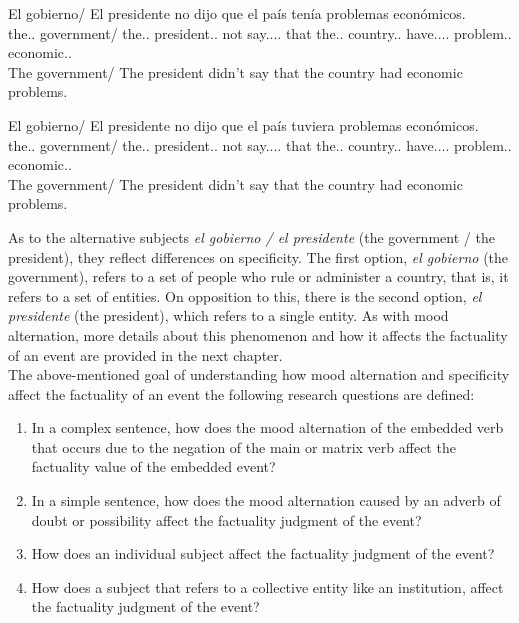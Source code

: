 \begin{exe}
  \ex
    \begin{xlist}
      \item{\gll El gobierno/ El presidente no dijo que el país tenía problemas económicos.\\ the.\M.\Sg{} government/ the.\M.\Sg{} president.\M.\Sg{} not say.\Pst.\Pfv.\Ind.\Tsg{} that the.\M.\Sg{} country.\F.\Sg{} have.\Pst.\Ipfv.\Ind.\Tsg{} problem.\M.\Pl{} economic.\M.\Pl{} \\\glt The government/ The president didn't say that the country had economic problems.}\label{ex:cond1}
      \item{\gll El gobierno/ El presidente no dijo que el país tuviera problemas económicos.\\ the.\M.\Sg{} government/ the.\M.\Sg{} president.\M.\Sg{} not say.\Pst.\Pfv.\Ind.\Tsg{} that the.\M.\Sg{} country.\F.\Sg{} have.\Pst.\Ipfv.\Sbjv.\Tsg{} problem.\M.\Pl{} economic.\M.\Pl{} \\\glt The government/ The president didn't say that the country had economic problems.}\label{ex:cond2}
    \end{xlist}
\end{exe}

As to the alternative subjects \textit{el gobierno / el presidente} (the government / the president), they reflect differences on specificity. The first option, \textit{el gobierno} (the government), refers to a set of people who rule or administer a country, that is, it refers to a set of entities. On opposition to this, there is the second option, \textit{el presidente} (the president), which refers to a single entity. As with mood alternation, more details about this phenomenon and how it affects the factuality of an event are provided in the next chapter.\\

The above-mentioned goal of understanding how mood alternation and specificity affect the factuality of an event the following research questions are defined:\\  

\begin{enumerate}[RQ1.-]
        \item In a complex sentence, how does the mood alternation of the embedded verb that occurs due to the negation of the main or matrix verb affect the factuality value of the embedded event?
        \item In a simple sentence, how does the mood alternation caused by an adverb of doubt or possibility affect the factuality judgment of the event?\label{item:rq2}
        \item How does an individual subject affect the factuality judgment of the event?
        \item How does a subject that refers to a collective entity like an institution, affect the factuality judgment of the event?\label{item:rq4}
\end{enumerate}

